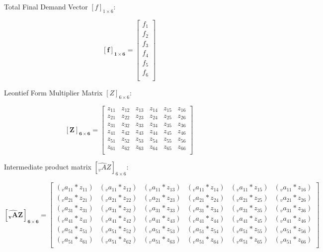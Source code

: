 \documentclass[
  letterpaper,
  DIV=11,
  numbers=noendperiod]{scrreprt}
\begin{document}
Total Final Demand Vector \([f]_{1\times 6}\):

\[\mathbf{[f]_{1\times 6}} = \left[\begin{array}
{rrr}
f_{1} \\
f_{2} \\
f_{3} \\
f_{4} \\
f_{5} \\
f_{6} \\
\end{array}\right]
\]

Leontief Form Multiplier Matrix \([Z]_{6\times 6}\):

\[\mathbf{[Z]_{6\times 6}} = \left[\begin{array}
{rrr}
z_{11} & z_{12} & z_{13} & z_{14} & z_{15} & z_{16} \\
z_{21} & z_{22} & z_{23} & z_{24} & z_{25} & z_{26} \\
z_{31} & z_{32} & z_{33} & z_{34} & z_{35} & z_{36} \\
z_{41} & z_{42} & z_{43} & z_{44} & z_{45} & z_{46} \\
z_{51} & z_{52} & z_{53} & z_{54} & z_{55} & z_{56} \\
z_{61} & z_{62} & z_{63} & z_{64} & z_{65} & z_{66} \\
\end{array}\right]
\]

Intermediate product matrix \([\widehat{_{v}A}Z]_{6\times 6}\):

\[\mathbf{[\widehat{_{v}A}Z]_{6\times 6}} = \left[\begin{array}
{rrr}
(_{v}a_{11}*z_{11}) & (_{v}a_{11}*z_{12}) & (_{v}a_{11}*z_{13}) & (_{v}a_{11}*z_{14}) & (_{v}a_{11}*z_{15}) & (_{v}a_{11}*z_{16}) \\
(_{v}a_{21}*z_{21}) & (_{v}a_{21}*z_{22}) & (_{v}a_{21}*z_{23}) & (_{v}a_{21}*z_{24}) & (_{v}a_{21}*z_{25}) & (_{v}a_{21}*z_{26}) \\
(_{v}a_{31}*z_{31}) & (_{v}a_{31}*z_{32}) & (_{v}a_{31}*z_{33}) & (_{v}a_{31}*z_{34}) & (_{v}a_{31}*z_{35}) & (_{v}a_{31}*z_{36}) \\
(_{v}a_{41}*z_{41}) & (_{v}a_{41}*z_{42}) & (_{v}a_{41}*z_{43}) & (_{v}a_{41}*z_{44}) & (_{v}a_{41}*z_{45}) & (_{v}a_{41}*z_{46}) \\
(_{v}a_{51}*z_{51}) & (_{v}a_{51}*z_{52}) & (_{v}a_{51}*z_{53}) & (_{v}a_{51}*z_{54}) & (_{v}a_{51}*z_{55}) & (_{v}a_{51}*z_{56}) \\
(_{v}a_{51}*z_{61}) & (_{v}a_{51}*z_{62}) & (_{v}a_{51}*z_{63}) & (_{v}a_{51}*z_{64}) & (_{v}a_{51}*z_{65}) & (_{v}a_{51}*z_{66}) \\
\end{array}\right]
\]
\end{document}
